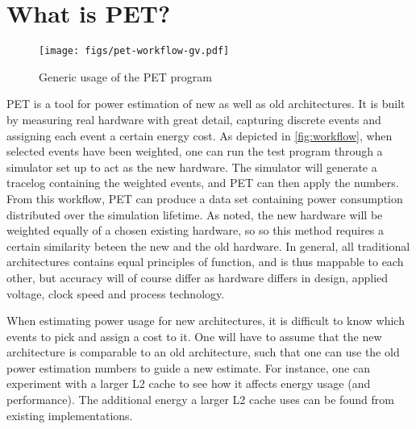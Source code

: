 \section{What is PET?}
\label{sec:whatispet}
\begin{figure}
    \texttt{[image: figs/pet-workflow-gv.pdf]}
    \caption{Generic usage of the PET program}
    \label{fig:workflow}
\end{figure}

PET is a tool for power estimation of new as well as old architectures. It is
built by measuring real hardware with great detail, capturing discrete events
and assigning each event a certain energy cost. As depicted in
\autoref{fig:workflow}, when selected events have been weighted, one can run the
test program through a simulator set up to act as the new hardware. The
simulator will generate a tracelog containing the weighted events, and PET can
then apply the numbers. From this workflow, PET can produce a data set
containing power consumption distributed over the simulation lifetime. As noted,
the new hardware will be weighted equally of a chosen existing hardware, so so
this method requires a certain similarity beteen the new and the old hardware.
In general, all traditional architectures contains equal principles of function,
and is thus mappable to each other, but accuracy will of course differ as
hardware differs in design, applied voltage, clock speed and process technology.

When estimating power usage for new architectures, it is difficult to know which
events to pick and assign a cost to it. One will have to assume that the new
architecture is comparable to an old architecture, such that one can use the old
power estimation numbers to guide a new estimate. For instance, one can
experiment with a larger L2 cache to see how it affects energy usage (and
performance). The additional energy a larger L2 cache uses can be found from
existing implementations.
